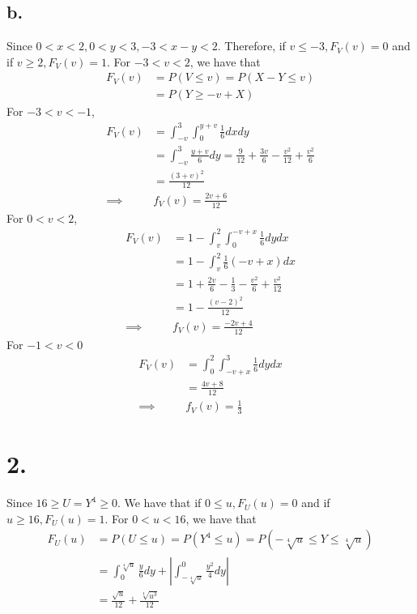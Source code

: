 \documentclass[11pt]{article}
\begin{document}
\subsection*{b.}
Since $0<x<2, 0<y<3, -3<x-y<2$. Therefore, if $v \le -3, F_V(v) = 0$ and if $v\ge 2, F_V(v) = 1$. 
For $-3<v<2$, we have that
\begin{equation*}
    \begin{aligned}
        F_V(v) &= P(V \le v) = P(X-Y\le v) \\ 
        &= P(Y\ge -v+X)         
    \end{aligned}
\end{equation*}
For $-3<v<-1$,
\begin{equation*}
    \begin{aligned}
        F_V(v) &= \int_{-v}^3 \int_{0}^{y+v} \frac{1}{6} dxdy \\
        &= \int_{-v}^3 \frac{y+v}{6} dy = \frac{9}{12} + \frac{3v}{6} -\frac{v^2}{12} + \frac{v^2}{6} \\
        &= \frac{(3+v)^2}{12} \\
        \implies & f_V(v) = \frac{2v+6}{12}
    \end{aligned}
\end{equation*} 
For $0<v<2$, 
\begin{equation*}
    \begin{aligned}
        F_V(v) &= 1- \int_v^2 \int_0^{-v+x} \frac{1}{6} dy dx \\
        &= 1- \int_v^2 \frac{1}{6}(-v+x) dx \\
        &= 1 +\frac{2v}{6} - \frac{1}{3} - \frac{v^2}{6} + \frac{v^2}{12}\\
        &= 1- \frac{(v-2)^2}{12} \\
        \implies & f_V(v) = \frac{-2v+4}{12}
    \end{aligned}
\end{equation*}
For $-1<v<0$
\begin{equation*}
    \begin{aligned}
        F_V(v) &= \int_0^2 \int_{-v+x}^3 \frac{1}{6} dydx \\
        &= \frac{4v+8}{12} \\
        \implies & f_V(v) = \frac{1}{3}
    \end{aligned}
\end{equation*}
\pagebreak
\section*{2.}
Since $ 16 \ge U = Y^4 \ge 0$. We have that if $0\le u, F_U(u) = 0$ and if $u\ge 16, F_U(u) = 1$.
For $0<u<16$, we have that
\begin{equation*}
    \begin{aligned}
        F_U(u) &= P(U\le u) = P(Y^4 \le u) = P(-\sqrt[4]{u} \le Y \le \sqrt[4]{u}) \\
        &=  \int_0^{\sqrt[4]{u}} \frac{y}{6} dy + \left|\int_{-\sqrt[4]{u}}^0 \frac{y^2}{4} dy \right|\\
        &= \frac{\sqrt{u}}{12} + \frac{\sqrt[4]{u^3}}{12}
    \end{aligned}
\end{equation*} 
\pagebreak
\end{document}
